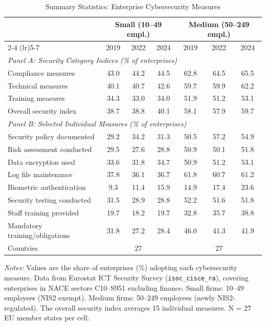 \begin{table}[H]
\centering
\caption{Summary Statistics: Enterprise Cybersecurity Measures}
\label{tab:summary}
\begin{threeparttable}
\begin{tabular}{lcccccc}
\toprule
 & \multicolumn{3}{c}{Small (10--49 empl.)} & \multicolumn{3}{c}{Medium (50--249 empl.)} \\
\cmidrule(lr){2-4} \cmidrule(lr){5-7}
 & 2019 & 2022 & 2024 & 2019 & 2022 & 2024 \\
\midrule
\multicolumn{7}{l}{\textit{Panel A: Security Category Indices (\% of enterprises)}} \\[3pt]
Compliance measures & 43.0 & 44.2 & 44.5 & 62.8 & 64.5 & 65.5 \\
Technical measures & 40.1 & 40.7 & 42.6 & 59.7 & 59.9 & 62.2 \\
Training measures & 34.3 & 33.0 & 34.0 & 51.9 & 51.2 & 53.1 \\
[3pt]
Overall security index & 38.7 & 38.8 & 40.1 & 58.1 & 57.9 & 59.7 \\
\midrule
\multicolumn{7}{l}{\textit{Panel B: Selected Individual Measures (\% of enterprises)}} \\[3pt]
Security policy documented & 29.2 & 34.2 & 31.3 & 50.5 & 57.2 & 54.9 \\
Risk assessment conducted & 29.5 & 27.6 & 28.8 & 50.9 & 50.1 & 51.8 \\
Data encryption used & 33.6 & 31.8 & 34.7 & 50.9 & 51.2 & 53.1 \\
Log file maintenance & 37.8 & 36.1 & 36.7 & 61.8 & 60.7 & 61.2 \\
Biometric authentication & 9.3 & 11.4 & 15.9 & 14.9 & 17.4 & 23.6 \\
Security testing conducted & 31.5 & 28.9 & 28.8 & 52.2 & 51.6 & 51.8 \\
Staff training provided & 19.7 & 18.2 & 19.7 & 32.8 & 35.7 & 38.8 \\
Mandatory training/obligations & 31.8 & 27.2 & 28.4 & 46.0 & 41.3 & 41.9 \\
\midrule
Countries & \multicolumn{3}{c}{27} & \multicolumn{3}{c}{27} \\
\bottomrule
\end{tabular}
\begin{tablenotes}[flushleft]
\small
\item \textit{Notes:} Values are the share of enterprises (\%) adopting each cybersecurity measure. Data from Eurostat ICT Security Survey (\texttt{isoc\_cisce\_ra}), covering enterprises in NACE sectors C10--S951 excluding finance. Small firms: 10--49 employees (NIS2 exempt). Medium firms: 50--249 employees (newly NIS2-regulated). The overall security index averages 15 individual measures. N = 27 EU member states per cell.
\end{tablenotes}
\end{threeparttable}
\end{table}
